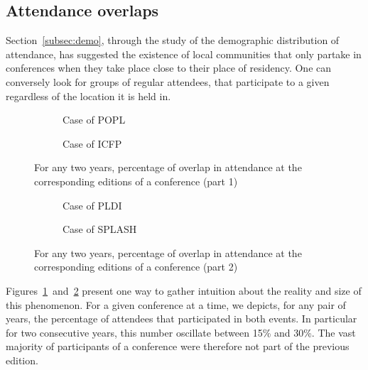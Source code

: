 \subsection{Attendance overlaps}
\label{subsec:overlap}

Section~\ref{subsec:demo}, through the study of the demographic distribution of
attendance, has suggested the existence of local communities that only
partake in conferences when they take place close to their place of residency.
One can conversely look for groups of regular attendees, that participate to a given \conf
regardless of the location it is held in.

\begin{figure}
\centering
     \begin{subfigure}[b]{0.4\textwidth}
       \centering
       \caption{Case of POPL}
     \end{subfigure}
     \hfill
     \begin{subfigure}[b]{0.4\textwidth}
       \centering
       \caption{Case of ICFP}
    \end{subfigure}

     \caption{For any two years, percentage of overlap in attendance at the corresponding editions of a conference (part 1)}
     \label{fig:overlap-conf-alpha}
\end{figure}

\begin{figure}
\centering
     \begin{subfigure}[b]{0.4\textwidth}
       \centering
       \caption{Case of PLDI}
     \end{subfigure}
     \begin{subfigure}[b]{0.4\textwidth}
       \centering
       \caption{Case of SPLASH}
     \end{subfigure}

     \caption{For any two years, percentage of overlap in attendance at the corresponding editions of a conference (part 2)}
     \label{fig:overlap-conf-beta}
\end{figure}

Figures~\ref{fig:overlap-conf-alpha}~and~\ref{fig:overlap-conf-beta} present one
way to gather intuition about the reality and size of this phenomenon. For a
given conference at a time, we depicts, for any pair of years, the percentage of
attendees that participated in both events. In particular for two consecutive
years, this number oscillate between 15\% and 30\%. The vast majority of
participants of a conference were therefore not part of the previous edition.

